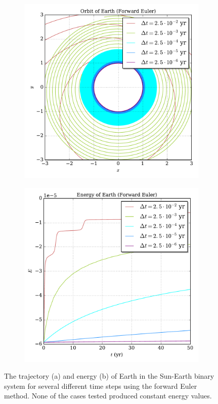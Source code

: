 \documentclass[prb,aps,twocolumn,showpacs,10pt]{revtex4-1}
\begin{document}
\begin{figure}
\centering
\begin{subfigure}{.5\textwidth}
  \centering
  \includegraphics[width=\linewidth]{binary_fixed_euler_orbit.pdf}
  \caption{\vspace*{1mm}}
  \label{fig:sub1}
\end{subfigure}%
\begin{subfigure}{.5\textwidth}
  \centering
  \includegraphics[width=\linewidth]{binary_fixed_euler_energy.pdf}
  \caption{\vspace*{1mm}}
  \label{fig:sub2}
\end{subfigure}
\caption{The trajectory (a) and energy (b) of Earth in the Sun-Earth binary system for several different time steps using the forward Euler method. None of the cases tested produced constant energy values.}
\label{fig:test}
\end{figure}
\end{document}
